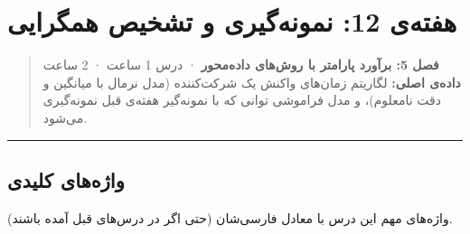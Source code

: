 \section{\texorpdfstring{هفته‌ی 12: نمونه‌گیری  و تشخیص
همگرایی}{هفته‌ی 12: نمونه‌گیری Gibbs و تشخیص همگرایی}}

\begin{quote}
\textbf{فصل 5: برآورد پارامتر با روش‌های داده‌محور } · درس 1
ساعت ·  2 ساعت \textbf{داده‌ی اصلی:} لگاریتم زمان‌های واکنش یک
شرکت‌کننده (مدل نرمال با میانگین و دقت نامعلوم)، و مدل فراموشی توانی که
با نمونه‌گیر  هفته‌ی قبل نمونه‌گیری می‌شود.
\end{quote}

\begin{center}\rule{0.5\linewidth}{0.5pt}\end{center}

\subsection{واژه‌های کلیدی}

واژه‌های مهم این درس با معادل فارسی‌شان (حتی اگر در درس‌های قبل آمده
باشند).

